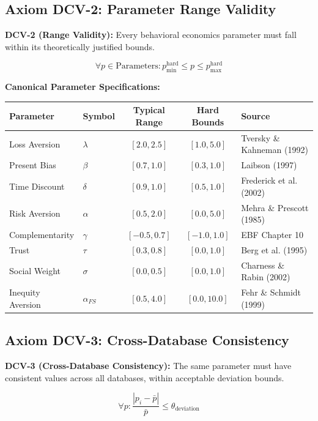 \subsection{Axiom DCV-2: Parameter Range Validity}

\begin{tcolorbox}[colback=blue!5!white, colframe=blue!75!black]
\textbf{DCV-2 (Range Validity):} Every behavioral economics parameter must fall within its theoretically justified bounds.

\begin{equation}
\forall p \in \text{Parameters}: p_{\min}^{\text{hard}} \leq p \leq p_{\max}^{\text{hard}}
\end{equation}
\end{tcolorbox}

\textbf{Canonical Parameter Specifications:}

\begin{center}
\begin{tabular}{llccl}
\toprule
\textbf{Parameter} & \textbf{Symbol} & \textbf{Typical Range} & \textbf{Hard Bounds} & \textbf{Source} \\
\midrule
Loss Aversion & $\lambda$ & $[2.0, 2.5]$ & $[1.0, 5.0]$ & Tversky \& Kahneman (1992) \\
Present Bias & $\beta$ & $[0.7, 1.0]$ & $[0.3, 1.0]$ & Laibson (1997) \\
Time Discount & $\delta$ & $[0.9, 1.0]$ & $[0.5, 1.0]$ & Frederick et al. (2002) \\
Risk Aversion & $\alpha$ & $[0.5, 2.0]$ & $[0.0, 5.0]$ & Mehra \& Prescott (1985) \\
Complementarity & $\gamma$ & $[-0.5, 0.7]$ & $[-1.0, 1.0]$ & EBF Chapter 10 \\
Trust & $\tau$ & $[0.3, 0.8]$ & $[0.0, 1.0]$ & Berg et al. (1995) \\
Social Weight & $\sigma$ & $[0.0, 0.5]$ & $[0.0, 1.0]$ & Charness \& Rabin (2002) \\
Inequity Aversion & $\alpha_{FS}$ & $[0.5, 4.0]$ & $[0.0, 10.0]$ & Fehr \& Schmidt (1999) \\
\bottomrule
\end{tabular}
\end{center}

\subsection{Axiom DCV-3: Cross-Database Consistency}

\begin{tcolorbox}[colback=blue!5!white, colframe=blue!75!black]
\textbf{DCV-3 (Cross-Database Consistency):} The same parameter must have consistent values across all databases, within acceptable deviation bounds.

\begin{equation}
\forall p: \frac{|p_i - \bar{p}|}{\bar{p}} \leq \theta_{\text{deviation}}
\end{equation}
\end{tcolorbox}

